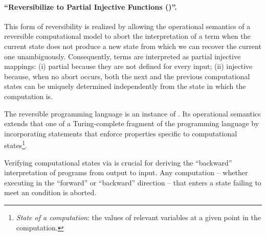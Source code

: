 \paragraph{``Reversibilize to Partial Injective Functions (\PIF)''.}
This form of reversibility is realized by allowing the operational semantics of a reversible computational model to abort the interpretation of a term when the current state does not produce a new state from which we can recover the current one unambiguously. 
Consequently, terms are interpreted as partial injective mappings: (i) partial because they are not defined for every input; (ii) injective because, when no abort occurs, 
both the next and the previous computational states can be
uniquely determined independently from the state in which the computation is.

The reversible programming language \JANUS \cite{LUTZ:JANUS86} is an instance of \PIF. Its operational semantics extends that one of a Turing-complete fragment of the \C programming language by incorporating  statements that enforce properties specific to computational states\footnote{\emph{State of a computation}: the values of relevant variables at a given point in the computation.}. 

Verifying computational states via  is crucial for deriving the ``backward'' interpretation of \JANUS programs from output to input. Any computation -- whether executing in the ``forward'' or ``backward'' direction -- that enters a state failing to meet an  condition is aborted.

